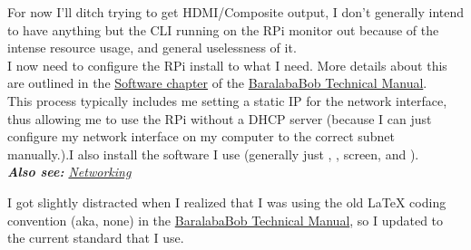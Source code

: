     		For now I'll ditch trying to get HDMI/Composite output, I don't generally intend to have anything but the CLI running on the RPi monitor out because of the intense resource usage, and general uselessness of it.\\
    		
    		I now need to configure the RPi install to what I need. More details about this are outlined in the \hyperref[raspbian_install]{Software chapter} of the \hyperref[part:part_six]{BaralabaBob Technical Manual}.\\
            
                		
    		This process typically includes me setting a static IP for the network interface, thus allowing me to use the RPi without a DHCP server (because I can just configure my network interface on my computer to the correct subnet manually.).I also install the software I use (generally just , , screen, and ).\\
            
			\textit{\textbf{Also see: }\hyperref[rpi_networking]{Networking}}                        
    		
    		I got slightly distracted when I realized that I was using the old LaTeX coding convention (aka, none) in the \hyperref[part:part_six]{BaralabaBob Technical Manual}, so I updated to the current standard that I use.\\